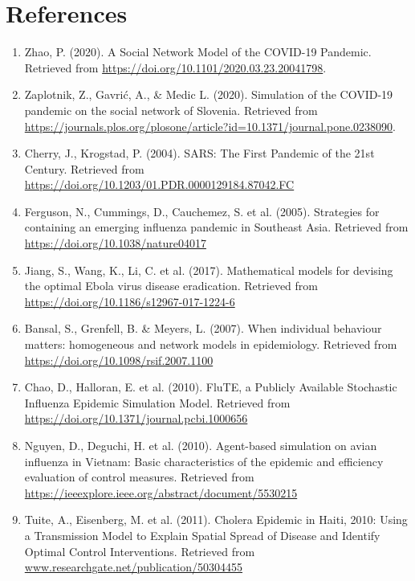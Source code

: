\documentclass[conference]{IEEEtran}
\begin{document}
    \section{References}
    \begin{enumerate}
        \item Zhao, P. (2020). A Social Network Model of the COVID-19 Pandemic. Retrieved from \url{https://doi.org/10.1101/2020.03.23.20041798}.
        
        \item Zaplotnik, Z., Gavrić, A., \& Medic L. (2020). Simulation of the COVID-19 pandemic on the social network of Slovenia. Retrieved from \url{https://journals.plos.org/plosone/article?id=10.1371/journal.pone.0238090}.
        
        \item Cherry, J., Krogstad, P. (2004). SARS: The First Pandemic of the 21st Century. Retrieved from \url{https://doi.org/10.1203/01.PDR.0000129184.87042.FC}
        
        \item Ferguson, N., Cummings, D., Cauchemez, S. et al. (2005). Strategies for containing an emerging influenza pandemic in Southeast Asia. Retrieved from \url{https://doi.org/10.1038/nature04017}
        
        \item Jiang, S., Wang, K., Li, C. et al. (2017). Mathematical models for devising the optimal Ebola virus disease eradication. Retrieved from \url{https://doi.org/10.1186/s12967-017-1224-6}
        
        \item Bansal, S., Grenfell, B. \& Meyers, L. (2007). When individual behaviour matters: homogeneous and network models in epidemiology. Retrieved from \url{https://doi.org/10.1098/rsif.2007.1100}
        
        \item Chao, D., Halloran, E. et al. (2010). FluTE, a Publicly Available Stochastic Influenza Epidemic Simulation Model. Retrieved from \url{https://doi.org/10.1371/journal.pcbi.1000656}
        
        \item Nguyen, D., Deguchi, H. et al. (2010). Agent-based simulation on avian influenza in Vietnam: Basic characteristics of the epidemic and efficiency evaluation of control measures. Retrieved from \url{https://ieeexplore.ieee.org/abstract/document/5530215}
        
        \item Tuite, A., Eisenberg, M. et al. (2011). Cholera Epidemic in Haiti, 2010: Using a Transmission Model to Explain Spatial Spread of Disease and Identify Optimal Control Interventions. Retrieved from \url{www.researchgate.net/publication/50304455}
        

\end{enumerate}
\end{document}
